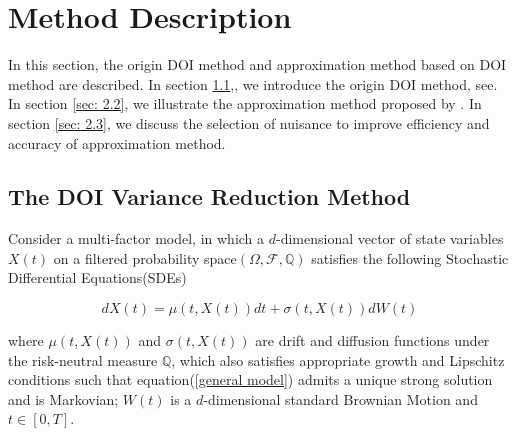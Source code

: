 \chapter{Method Description}

In this section, the origin DOI method and approximation method based on DOI method are described. In section \ref{sec: 2.1},, we introduce the origin DOI method, see\cite{heath_monte_nodate}. In section \ref{sec: 2.2}, we illustrate the approximation method proposed by \cite{kristensen_adding_2011}. In section \ref{sec: 2.3}, we discuss the selection of nuisance to improve efficiency and accuracy of approximation method.

\section{The DOI Variance Reduction Method}
\label{sec: 2.1}

Consider a multi-factor model, in which a $d$-dimensional vector of state variables $X(t)$ on a filtered probability space$(\Omega,\mathcal F, \mathbb Q)$ satisfies the following Stochastic Differential Equations(SDEs)

\begin{equation}\label{general model}
    dX(t) = \mu(t, X(t)) dt + \sigma(t, X(t)) dW(t)
\end{equation}

\noindent where $\mu(t,X(t))$ and $\sigma(t, X(t))$ are drift and diffusion functions under the risk-neutral measure $\mathbb Q$, which also satisfies appropriate growth and Lipschitz conditions such that equation(\ref{general model}) admits a unique strong solution and is Markovian; $W(t)$ is a $d$-dimensional standard Brownian Motion and $t \in [0,T]$.





